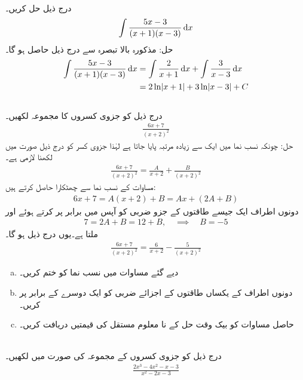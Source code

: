 \\
درج ذیل حل کریں۔
\begin{align*}
\int \frac{5x-3}{(x+1)(x-3)}\dif x
\end{align*}
حل:\quad
مذکورہ بالا تبصرہ سے درج ذیل حاصل ہو گا۔
\begin{align*}
\int\frac{5x-3}{(x+1)(x-3)}\dif x&=\int \frac{2}{x+1}\dif x+\int\frac{3}{x-3}\dif x\\
&=2\ln\abs{x+1}+3\ln\abs{x-3}+C
\end{align*}
\\
درج ذیل کو جزوی کسروں کا مجموعہ لکھیں۔
\begin{align*}
\frac{6x+7}{(x+2)^2}
\end{align*} 
حل:\quad
چونکہ نسب نما میں  ایک سے زیادہ مرتبہ پایا جاتا ہے لہٰذا جزوی کسر کو درج ذیل صورت میں لکھنا لازمی ہے۔
\begin{align}\label{مساوات_طریقہ_جزوی_کسر_دہراتا_الف}
\frac{6x+7}{(x+2)^2}=\frac{A}{x+2}+\frac{B}{(x+2)^2}
\end{align}
مساوات  کے نسب نما سے چھٹکارا حاصل کرتے ہیں:
\begin{align*}
6x+7=A(x+2)+B=Ax+(2A+B)
\end{align*} 
دونوں اطراف ایک جیسے طاقتوں کے جزو ضربی کو آپس میں برابر پر کرتے ہوئے   اور 
\begin{align*}
7=2A+B=12+B,\quad \implies \quad B=-5
\end{align*}
ملتا ہے۔یوں درج ذیل ہو گا۔
\begin{align*}
\frac{6x+7}{(x+2)^2}=\frac{6}{x+2}-\frac{5}{(x+2)^2}
\end{align*}
\begin{enumerate}[a.]
\item
دیے گئے مساوات میں نسب نما کو ختم کریں۔
\item
دونوں اطراف  کے یکساں طاقتوں کے اجزائے ضربی کو ایک دوسرے کے برابر پر کریں۔
\item
حاصل مساوات کو بیک وقت حل کے نا معلوم مستقل کی قیمتیں دریافت کریں۔ 
\end{enumerate}

\\
درج ذیل کو جزوی کسروں کے مجموعہ کی صورت میں لکھیں۔
\begin{align*}
\frac{2x^3-4x^2-x-3}{x^2-2x-3}
\end{align*}

